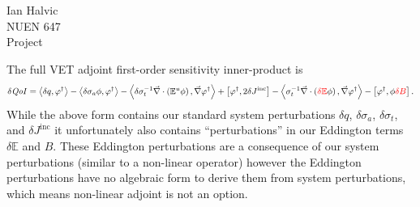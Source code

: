 \documentclass{article}
\newcommand{\bra}{\left\langle}
\newcommand{\ket}{\right\rangle}
\newcommand{\sbra}{\left[}
\newcommand{\sket}{\right]}
\renewcommand{\div}{\vec{\nabla} \cdot}
\newcommand{\grad}{\vec{\nabla}}
\newcommand{\vefadj}{\varphi^\dag}
\newcommand{\Edd}{\mathbb{E}}
\newcommand{\BEdd}{B}
\newcommand{\sigt}{\sigma_t}
\newcommand{\siga}{\sigma_a}
\newcommand{\isigt}{\sigma_t^{-1}}
\newcommand{\scalSource}{q}
\newcommand{\qoi}{{\it QoI}\xspace}
\newcommand{\tcr}[1]{\textcolor{red}{#1}}
\begin{document}
\begin{center}
Ian Halvic \\
NUEN 647\\
Project\\
\end{center}

The full VET adjoint first-order sensitivity inner-product is
\begin{equation}
\label{EQ:VETsens}
\delta \qoi = \bra \delta \scalSource, \vefadj  \ket - \bra \delta \siga \phi, \vefadj \ket  - \bra \delta \isigt \div \left( \Edd^u \phi \right) , \grad \vefadj \ket + \sbra \vefadj, 2 \delta J^{\text{inc}} \sket - \bra  \isigt \div \left( \tcr{\delta \Edd} \phi \right), \grad \vefadj \ket
- \sbra \vefadj, \phi \tcr{\delta \BEdd} \sket .
\end{equation}
While the above form contains our standard system perturbations $\delta \scalSource$, $\delta \siga$, $\delta \sigt$, and $\delta J^{\text{inc}}$ it unfortunately also contains ``perturbations'' in our Eddington terms $\delta \Edd$ and $ \BEdd$. These Eddington perturbations are a consequence of our system perturbations (similar to a non-linear operator) however the Eddington perturbations have no algebraic form to derive them from system perturbations, which means non-linear adjoint is not an option. 
\end{document}
